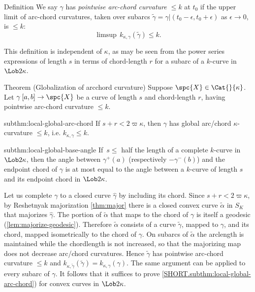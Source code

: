 \begin{thm}{Definition}
\label{ptwise-arc-chord}
 We say $\gamma$ has \emph{pointwise arc-chord curvature $\le k$} at $t_0$ if 
 the upper limit of arc-chord curvatures, taken over 
subarcs $ \tilde \gamma=\gamma|(t_0-\epsilon,t_0+\epsilon)$ as $\epsilon\to 0$, is $\le k$: 
$$ \limsup \,k_{\kappa,\gamma}( \tilde \gamma)\le k.$$  
\end{thm}


This definition is independent of $\kappa$, as may be seen from the power series expressions of length $s$ in terms of chord-length $r$ for a subarc of a $k$-curve in $\Lob2{\kappa}$.

\begin{thm}{Theorem (Globalization of arcchord curvature)}\label{thm:globa-arc-chord}
  Suppose $\spc{X}\in\Cat{}{\kappa}$. Let $\gamma\:[a,b]\to\spc{X}$ be a curve of length $s$ and chord-length $r$, having pointwise arc-chord curvature
$ \le k$.  
\begin{subthm}{subthm:local-global-arc-chord}
If $s+r<2\varpi\kappa$, then
$\gamma$ has global arc/chord $\kappa$-curvature $\le k$, i.e.  $k_{\kappa,\gamma} \le k$. 
\end{subthm}
\begin{subthm}{subthm:local-global-base-angle}
If \,$s\le$ half the length of a complete $k$-curve in $\Lob2{\kappa}$, then  
the angle between $\gamma^+(a)$ (respectively $-\gamma^-(b)$)  and the endpoint chord of $\gamma$ is at most equal to the angle between a $k$-curve of length $s$ and  its endpoint chord in $\Lob2{\kappa}$.
\end{subthm}{}
\end{thm}

Let us complete $\gamma$
to a closed curve $\hat\gamma$ by including its chord. Since $s+r<2\varpi\kappa$, by Reshetnyak
majorization  \ref{thm:major} there is a closed convex curve $\tilde\alpha$ in $S_K$ that
majorizes $\hat\gamma$. The portion of $\tilde\alpha$ that maps to the
chord of $\gamma$ is itself a  geodesic (\ref{lem:majorize-geodesic}).  Therefore
$\tilde\alpha$ consists of a curve $\tilde\gamma$, mapped to $\gamma$, and its
chord, mapped isometrically to the chord of $\gamma$. On subarcs of
$\tilde\alpha$ the arclength is maintained while the chordlength is not
increased, so that the majorizing map does not decrease arc/chord
curvatures. Hence $\tilde\gamma$  has pointwise arc-chord curvature $\le k$  and  $k_{\kappa,\tilde\gamma}(\tilde\gamma)= k_{\kappa,\gamma}(\gamma)$. The same argument can be applied to every subarc of $\gamma$.
It follows that it suffices to prove \ref{SHORT.subthm:local-global-arc-chord}) for convex curves in $\Lob2\kappa$.  

